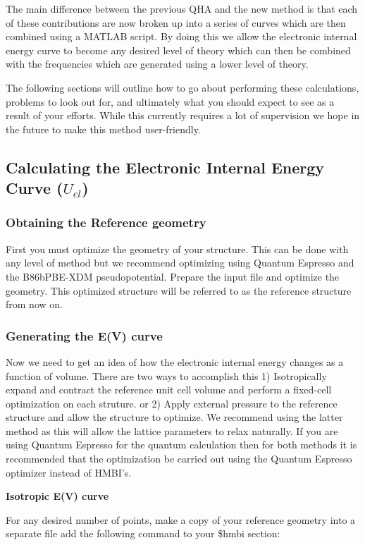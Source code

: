 \documentclass[11pt,letterpaper]{article}
\begin{document}
\begin{spacing}{1.0}
The main difference between the previous QHA and the new method is that each of these contributions are now broken up into a series of curves which are then combined using a MATLAB script. By doing this we allow the electronic internal energy curve to become any desired level of theory which can then be combined with the frequencies which are generated using a lower level of theory. 

The following sections will outline how to go about performing these calculations, problems to look out for, and ultimately what you should expect to see as a result of your efforts. While this currently requires a lot of supervision we hope in the future to make this method user-friendly.

\subsection{Calculating the Electronic Internal Energy Curve ($U_{el}$)}

\subsubsection{Obtaining the Reference geometry}
First you must optimize the geometry of your structure. This can be done with any level of method but we recommend optimizing using Quantum Espresso and the B86bPBE-XDM pseudopotential. Prepare the input file and optimize the geometry. This optimized structure will be referred to as the reference structure from now on.

\subsubsection{Generating the E(V) curve}
Now we need to get an idea of how the electronic internal energy changes as a function of volume. There are two ways to accomplish this 1) Isotropically expand and contract the reference unit cell volume and perform a fixed-cell optimization on each struture. or 2) Apply external pressure to the reference structure and allow the structure to optimize. We recommend using the latter method as this will allow the lattice parameters to relax naturally. If you are using Quantum Espresso for the quantum calculation then for both methods it is recommended that the optimization be carried out using the Quantum Espresso optimizer instead of HMBI's.

\textbf{Isotropic E(V) curve}

\vspace{2mm}
For any desired number of points, make a copy of your reference geometry into a separate file add the following command to your \$hmbi section:


\end{spacing}
\end{document}
